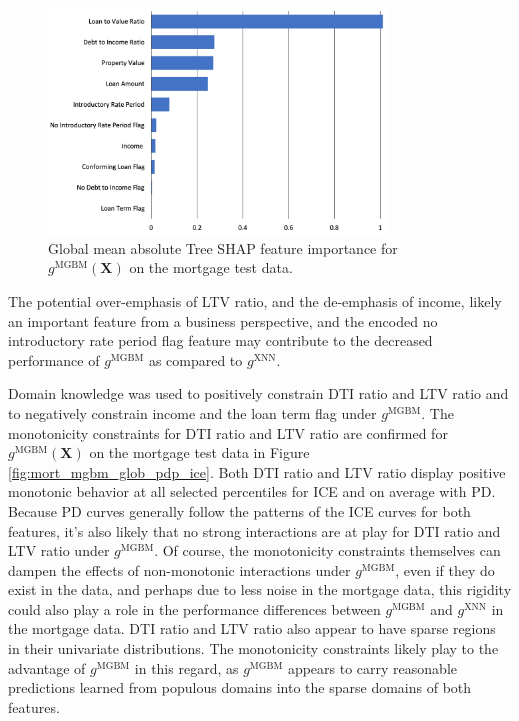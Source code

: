 \documentclass[information,article,submit,moreauthors,pdftex]{definitions/mdpi}
\begin{document}
\begin{figure}[H]
\centering
\includegraphics[width=9cm]{img/mort_mgbm_glob.png}
\caption{Global mean absolute Tree SHAP feature importance for $g^\text{MGBM}(\mathbf{X})$ on the mortgage test data.}
\label{fig:mort_mgbm_glob}
\end{figure} 

\noindent The potential over-emphasis of LTV ratio, and the de-emphasis of income, likely an important feature from a business perspective, and the encoded no introductory rate period flag feature may contribute to the decreased performance of $g^\text{MGBM}$ as compared to $g^\text{XNN}$.

Domain knowledge was used to positively constrain DTI ratio and LTV ratio and to negatively constrain income and the loan term flag under $g^\text{MGBM}$. The monotonicity constraints for DTI ratio and LTV ratio are confirmed for $g^\text{MGBM}(\mathbf{X})$ on the mortgage test data in Figure \ref{fig:mort_mgbm_glob_pdp_ice}. Both DTI ratio and LTV ratio display positive monotonic behavior at all selected percentiles for ICE and on average with PD. Because PD curves generally follow the patterns of the ICE curves for both features, it's also likely that no strong interactions are at play for DTI ratio and LTV ratio under $g^\text{MGBM}$. Of course, the monotonicity constraints themselves can dampen the effects of non-monotonic interactions under $g^\text{MGBM}$, even if they do exist in the data, and perhaps due to less noise in the mortgage data, this rigidity could also play a role in the performance differences between $g^\text{MGBM}$ and $g^\text{XNN}$ in the mortgage data. DTI ratio and LTV ratio also appear to have sparse regions in their univariate distributions. The monotonicity constraints likely play to the advantage of $g^\text{MGBM}$ in this regard, as $g^\text{MGBM}$ appears to carry reasonable predictions learned from populous domains into the sparse domains of both features. 
\end{document}
